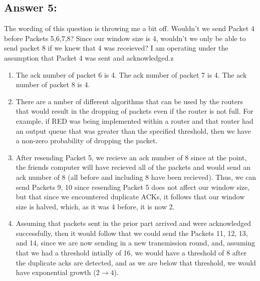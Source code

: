 \documentclass[10pt]{article}
\begin{document}
\subsection*{Answer 5:}
The wording of this question is throwing me a bit off. Wouldn't we send Packet 4 before Packets 5,6,7,8? Since our window size is 4, wouldn't we only be able to send packet 8 if we knew that 4 was receieved? I am operating under the assumption that Packet 4 was sent and acknowledged.z
\begin{enumerate}
  \item The ack number of packet 6 is 4. The ack number of packet 7 is 4. The ack number of packet 8 is 4.
  \item There are a nmber of different algorithms that can be used by the routers that would result in the dropping of packets even if the router is not full. For example, if RED was being implemented within a router and that router had an output queue that was greater than the specified threshold, then we have a non-zero probability of dropping the packet.
  \item After resending Packet 5, we recieve an ack number of 8 since at the point, the friends computer will have recieved all of the packets and would send an ack number of 8 (all before and including 8 have been recieved). Thus, we can send Packets 9, 10 since resending Packet 5 does not affect our window size, but that since we encountered duplicate ACKs, it follows that our window size is halved, which, as it was 4 before, it is now 2.
  \item Assuming that packets sent in the prior part arrived and were acknowledged successfully, then it would follow that we could send the Packets 11, 12, 13, and 14, since we are now sending in a new transmission round, and, assuming that we had a threshold intially of 16, we would have a threshold of 8 after the duplicate acks are detected, and as we are below that threshold, we would have exponential growth ($2 \to 4$).
\end{enumerate}
\newpage
\end{document}
